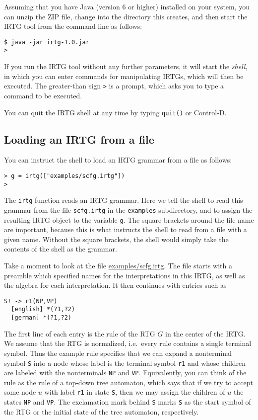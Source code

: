 \documentclass[11pt]{article}
\begin{document}
Assuming that you have Java (version 6 or higher) installed on your
system, you can unzip the ZIP file, change into the directory this
creates, and then start the IRTG tool from the command line as
follows:

\begin{verbatim}
$ java -jar irtg-1.0.jar
>
\end{verbatim}

If you run the IRTG tool without any further parameters, it will
start the \emph{shell}, in which you can enter commands for
manipulating IRTGs, which will then be executed. The greater-than sign
\verb?>? is a prompt, which asks you to type a command to be
executed.

You can quit the IRTG shell at any time by typing \verb?quit()? or
Control-D.



\subsection{Loading an IRTG from a file}

You can instruct the shell to load an IRTG grammar from a file as
follows:

\begin{verbatim}
> g = irtg(["examples/scfg.irtg"])
>
\end{verbatim}

The \verb?irtg? function reads an IRTG grammar. Here we tell the shell
to read this grammar from the file \verb?scfg.irtg? in the
\verb?examples? subdirectory, and to assign the resulting IRTG object
to the variable \verb?g?. The square brackets around the file name are
important, because this is what instructs the shell to read from a
file with a given name. Without the square brackets, the shell would
simply take the contents of the shell as the grammar.

Take a moment to look at the file \url{examples/scfg.irtg}. The file
starts with a preamble which specified names for the interpretations
in this IRTG, as well as the algebra for each interpretation. It then
continues with entries such as

\begin{verbatim}
S! -> r1(NP,VP)
  [english] *(?1,?2)
  [german] *(?1,?2)
\end{verbatim}

The first line of each entry is the rule of the RTG $G$ in the center of
the IRTG.  We assume that the RTG is normalized, i.e.\ every rule
contains a single terminal symbol.  Thus the example rule specifies
that we can expand a nonterminal symbol \verb?S? into a node whose
label is the terminal symbol \verb?r1? and whose children are labeled
with the nonterminals \verb?NP? and \verb?VP?.  Equivalently, you can
think of the rule as the rule of a top-down tree automaton, which says
that if we try to accept some node $u$ with label \verb?r1? in state
\verb?S?, then we may assign the children of $u$ the states \verb?NP?
and \verb?VP?.  The exclamation mark behind \verb?S? marks \verb?S? as
the start symbol of the RTG or the initial state of the tree
automaton, respectively.
\end{document}
